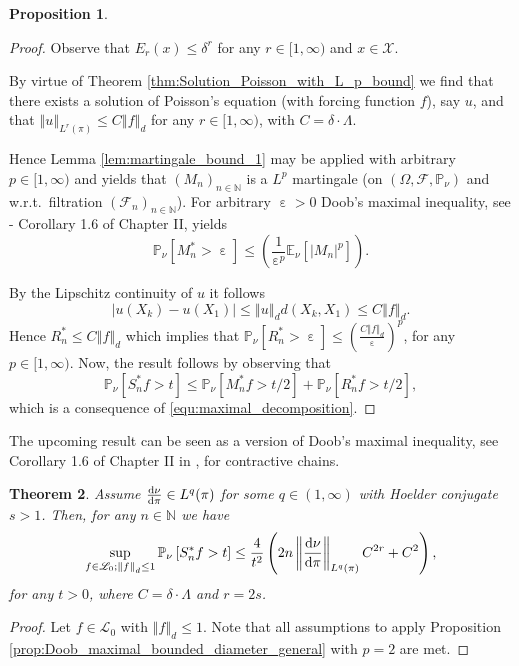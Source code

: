 \documentclass[12pt]{article}
\theoremstyle{plain}
\newtheorem{thm}{Theorem}[section]
\newtheorem{prop}[thm]{Proposition}
\renewcommand{\d}{{\rm d}}
\newcommand{\norm}[1]{\left\Vert #1 \right\Vert}
\newcommand{\N}{\mathbb{N}}
\newcommand{\E}{\mathbb{E}}
\newcommand{\cX}{\mathcal{X}}
\DeclareMathOperator{\eps}{\varepsilon}
\begin{document}
{\begin{prop}
\end{prop}

\begin{proof}
Observe that $E_r (x) \leq \delta^r$ for any $r \in [1, \infty)$ and $x \in \cX$.


By virtue of Theorem \ref{thm:Solution_Poisson_with_L_p_bound} we find that there exists a solution of Poisson's equation (with forcing function $f$), say $u$, and that $\norm{u}_{L^r(\pi)} \leq C \norm{f}_d$ for any $r \in [1,\infty)$, with $C= \delta \cdot \Lambda$.

Hence Lemma \ref{lem:martingale_bound_1} may be applied with arbitrary $p\in [1, \infty)$ and yields that $(M_n)_{n \in \N}$ is a $L^p$ martingale (on $(\Omega, \mathcal{F}, \mathbb{P}_\nu)$ and w.r.t.~filtration $(\mathcal{F}_n)_{n \in \N}$). For arbitrary $\eps>0$ Doob's maximal inequality, see \cite{revuz1999continuous} - Corollary 1.6 of Chapter II, yields 
\[
\mathbb{P}_\nu\left[ M_n^* > \eps \right] \leq \left(\frac{1}{\eps^p} \E_\nu[\vert M_n\vert^p] \right).
\] 


By the Lipschitz continuity of $u$ it follows 
\[
\vert u(X_k) - u(X_1)\vert \leq \norm{u}_d d(X_k, X_1) \leq C \norm{f}_d .
\]
Hence $R^*_n \leq C \norm{f}_d$ which implies that $\mathbb{P}_\nu[R_n^* > \eps] \leq \left(\frac{C  \norm{f}_d}{\eps}\right)^p$, for any $p \in [1, \infty)$.
Now, the result follows by observing that 
\[
\mathbb{P}_\nu\left[  S_n^*f > t \right] \leq \mathbb{P}_\nu\left[  M_n^*f > t/2 \right] + \mathbb{P}_\nu\left[  R_n^*f > t/2 \right],
\]
which is a consequence of \eqref{equ:maximal_decomposition}.
\end{proof}


The upcoming result can be seen as a version of Doob's maximal inequality, see Corollary 1.6 of Chapter II in \cite{revuz1999continuous}, for contractive chains. 
\begin{thm}\label{thm:Doob_maximal_bounded_diameter}
Assume $\frac{\d\nu}{\d\pi}\in L^q(\pi)$ for some $q \in (1, \infty)$ with Hoelder conjugate $s>1$.
Then, for any $n \in \N$  we have 
\[
\sup_{f \in \mathscr{L}_0; \norm{f}_d \leq 1}
\mathbb{P}_\nu\left[  S_n^*f > t \right] \leq \frac{4}{t^2}\left( 2n\norm{\frac{\d \nu}{\d \pi}}_{L^q(\pi)} C^{2r} + C^2\right),
\]
for any $t>0$,
where $C= \delta\cdot \Lambda$ and $r = 2s$.
\end{thm}

\begin{proof}
	Let $f\in \mathscr{L}_0$ with $\norm{f}_d\leq 1$.  
Note that all assumptions to apply Proposition \ref{prop:Doob_maximal_bounded_diameter_general} with $p=2$ are met.  


\end{proof}}
\end{document}
